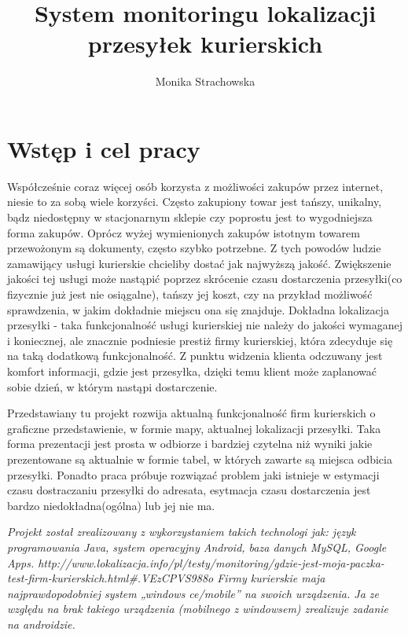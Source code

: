 \documentclass[eng,printmode,oneside]{mgr}
\title{System monitoringu lokalizacji przesyłek kurierskich}
\author{Monika Strachowska}
\begin{document}

\maketitle %


\tableofcontents %

\chapter{Wstęp i cel pracy}

Współcześnie coraz więcej osób korzysta z możliwości zakupów przez internet,
niesie to za sobą wiele korzyści. Często zakupiony towar jest tańszy, unikalny,
bądz niedostępny w stacjonarnym sklepie czy poprostu jest to wygodniejsza forma
zakupów. Oprócz wyżej wymienionych zakupów istotnym towarem przewożonym
są dokumenty, często szybko potrzebne. Z tych powodów ludzie zamawijący usługi 
kurierskie chcieliby dostać jak najwyższą jakość. Zwiększenie jakości tej
usługi może nastąpić poprzez skrócenie czasu dostarczenia przesyłki(co
fizycznie już jest nie osiągalne), tańszy jej koszt, czy na przykład możliwość
sprawdzenia, w jakim dokładnie miejscu ona się znajduje. Dokładna lokalizacja
przesyłki - taka funkcjonalność usługi kurierskiej nie należy do jakości
wymaganej i koniecznej, ale znacznie podniesie prestiż firmy
kurierskiej, która zdecyduje się na taką dodatkową funkcjonalność. Z punktu
widzenia klienta odczuwany jest komfort informacji, gdzie jest przesyłka, dzięki
temu klient może zaplanować sobie dzień, w którym nastąpi dostarczenie. 

Przedstawiany tu projekt rozwija aktualną funkcjonalność firm kurierskich o
graficzne przedstawienie, w formie mapy, aktualnej lokalizacji przesyłki. Taka
forma prezentacji jest prosta w odbiorze i bardziej czytelna niż wyniki
jakie prezentowane są aktualnie w formie tabel, w których zawarte są miejsca
odbicia przesyłki. Ponadto praca próbuje rozwiązać problem jaki istnieje w
estymacji czasu dostraczaniu przesyłki do adresata, esytmacja czasu
dostarczenia jest bardzo niedokładna(ogólna) lub jej nie ma.

\emph{\color{komentarz}
Projekt został zrealizowany z wykorzystaniem takich
technologi jak:
język programowania Java, system operacyjny Android, baza danych MySQL, Google Apps.
http://www.lokalizacja.info/pl/testy/monitoring/gdzie-jest-moja-paczka-test-firm-kurierskich.html\#.VEzCPVS988o
Firmy kurierskie maja najprawdopodobniej system „windows ce/mobile” na swoich urządzenia. Ja ze względu na brak takiego urządzenia (mobilnego z windowsem) 
zrealizuje zadanie na androidzie.
}
\end{document}
